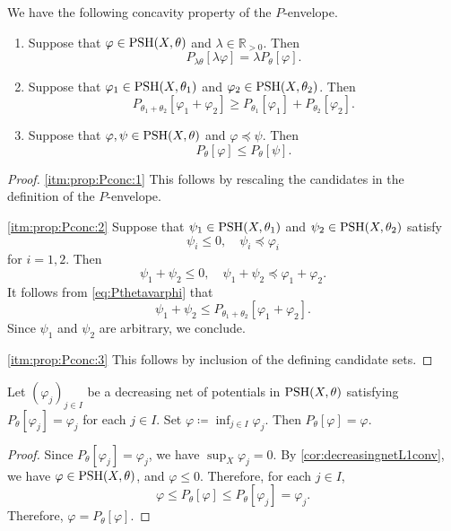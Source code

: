 We have the following concavity property of the $P$-envelope.
\begin{proposition}\label{prop:Pconc}
    \leavevmode
    \begin{enumerate}
        \item\label{itm:prop:Pconc:1} Suppose that $\varphi\in \mathrm{PSH}(X,\theta)$ and $\lambda\in \mathbb{R}_{>0}$. Then
            \[
                P_{\lambda\theta}[\lambda\varphi]=\lambda P_{\theta}[\varphi].
            \]
        \item\label{itm:prop:Pconc:2} Suppose that $\varphi_1\in \mathrm{PSH}(X,\theta_1)$ and $\varphi_2\in \mathrm{PSH}(X,\theta_2)$. Then
            \[
                P_{\theta_1+\theta_2}[\varphi_1+\varphi_2]\geq P_{\theta_1}[\varphi_1]+P_{\theta_2}[\varphi_2].
            \]
        \item\label{itm:prop:Pconc:3} Suppose that $\varphi,\psi\in \mathrm{PSH}(X,\theta)$ and $\varphi\preceq \psi$. Then
            \[
                P_{\theta}[\varphi]\leq P_{\theta}[\psi].
            \]
    \end{enumerate}
\end{proposition}
\begin{proof}
    \ref{itm:prop:Pconc:1} This follows by rescaling the candidates in the definition of the $P$-envelope.

    \ref{itm:prop:Pconc:2} Suppose that $\psi_1\in \mathrm{PSH}(X,\theta_1)$ and $\psi_2\in \mathrm{PSH}(X,\theta_2)$ satisfy
    \[
        \psi_i\leq 0,\quad \psi_i\preceq \varphi_i
    \]
    for $i=1,2$. Then
    \[
        \psi_1+\psi_2\leq 0,\quad \psi_1+\psi_2\preceq \varphi_1+\varphi_2.
    \]
    It follows from \eqref{eq:Pthetavarphi} that
    \[
        \psi_1+\psi_2\leq P_{\theta_1+\theta_2}[\varphi_1+\varphi_2].
    \]
    Since $\psi_1$ and $\psi_2$ are arbitrary, we conclude.

    \ref{itm:prop:Pconc:3} This follows by inclusion of the defining candidate sets.
\end{proof}











\begin{proposition}\label{prop:decseqmodel}
    Let $(\varphi_j)_{j\in I}$ be a decreasing net of potentials in $\mathrm{PSH}(X,\theta)$ satisfying $P_{\theta}[\varphi_j]=\varphi_j$ for each $j\in I$. Set $\varphi\coloneqq \inf_{j\in I} \varphi_j$. Then $P_{\theta}[\varphi]=\varphi$.
\end{proposition}
\begin{proof}
    Since $P_{\theta}[\varphi_j]=\varphi_j$, we have $\sup_X\varphi_j=0$. By \cref{cor:decreasingnetL1conv}, we have $\varphi\in \mathrm{PSH}(X,\theta)$, and $\varphi\leq 0$. Therefore, for each $j\in I$,
    \[
        \varphi\leq P_{\theta}[\varphi]\leq P_{\theta}[\varphi_j] =\varphi_j.
    \]
    Therefore, $\varphi=P_{\theta}[\varphi]$.
\end{proof}


